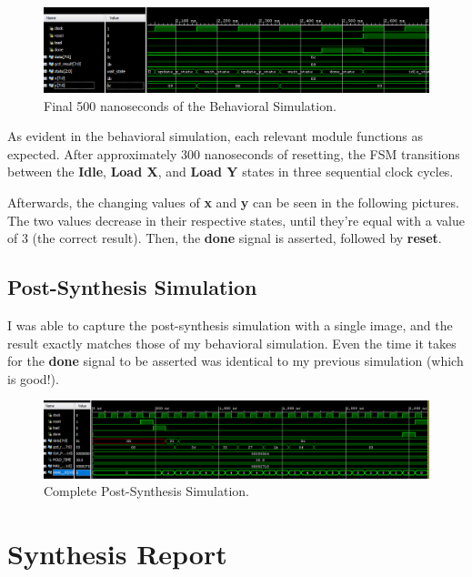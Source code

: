 \documentclass[a4paper, 12pt]{article}
\begin{document}
\begin{figure}[H]
\centering
\includegraphics[width=\textwidth]{Project_2/Outputs/Sim4.PNG}
\caption{Final 500 nanoseconds of the Behavioral Simulation.}
\label{fig:behav-sim4}
\end{figure}

As evident in the behavioral simulation, each relevant module functions as expected. After approximately 300 nanoseconds of resetting, the FSM transitions between the \textbf{Idle}, \textbf{Load X}, and \textbf{Load Y} states in three sequential clock cycles.

Afterwards, the changing values of \textbf{x} and \textbf{y} can be seen in the following pictures. The two values decrease in their respective states, until they're equal with a value of $3$ (the correct result). Then, the \textbf{done} signal is asserted, followed by \textbf{reset}. 

\subsection{Post-Synthesis Simulation}
I was able to capture the post-synthesis simulation with a single image, and the result exactly matches those of my behavioral simulation. Even the time it takes for the \textbf{done} signal to be asserted was identical to my previous simulation (which is good!).

\begin{figure}[H]
\centering
\includegraphics[width=\textwidth]{Project_2/Outputs/Post-Synth-Sim1.PNG}
\caption{Complete Post-Synthesis Simulation.}
\label{fig:post-synth-sim}
\end{figure}

\section{Synthesis Report}
\end{document}

